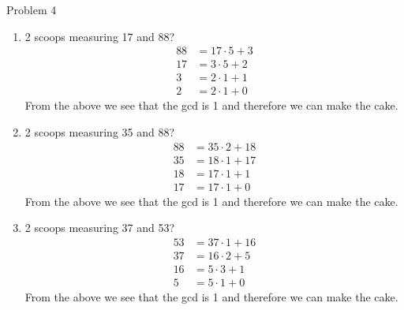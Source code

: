 \begin{problem}{Problem 4}
    \begin{highlight}[Solution]
        \begin{enumerate}[label = (\alph*)]
            \item 2 scoops measuring 17 and 88?
            \begin{align*}
                88 & = 17 \cdot 5 + 3 \\
                17 & = 3 \cdot 5 + 2 \\
                3 & = 2 \cdot 1 + 1 \\
                2 & = 2 \cdot 1 + 0
            \end{align*}
            From the above we see that the gcd is 1 and therefore we can make the cake.
            \item 2 scoops measuring 35 and 88?
            \begin{align*}
                88 & = 35 \cdot 2 + 18 \\
                35 & = 18 \cdot 1 + 17 \\
                18 & = 17 \cdot 1 + 1 \\
                17 & = 17 \cdot 1 + 0
            \end{align*}
            From the above we see that the gcd is 1 and therefore we can make the cake.
            \item 2 scoops measuring 37 and 53?
            \begin{align*}
                53 & = 37 \cdot 1 + 16 \\
                37 & = 16 \cdot 2 + 5 \\
                16 & = 5 \cdot 3 + 1 \\
                5 & = 5 \cdot 1 + 0
            \end{align*}
            From the above we see that the gcd is 1 and therefore we can make the cake.
        \end{enumerate}
    \end{highlight}
\end{problem}

